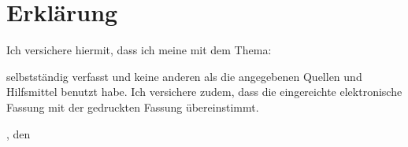 \chapter*{Erklärung}
	Ich versichere hiermit, dass ich meine \arbeit{} mit dem Thema:
	\begin{quote}
		\textit{\titel}
	\end{quote}
	selbstständig verfasst und keine anderen als die angegebenen Quellen und Hilfsmittel benutzt habe. Ich versichere zudem, dass die eingereichte elektronische Fassung mit der gedruckten Fassung übereinstimmt. 
	\vspace{1cm}
	
	\abgabeOrt, den \abgabeDatum \\[0.5cm]
	{\makebox[6cm]{\hrulefill}}\\ 
	\autorReverse